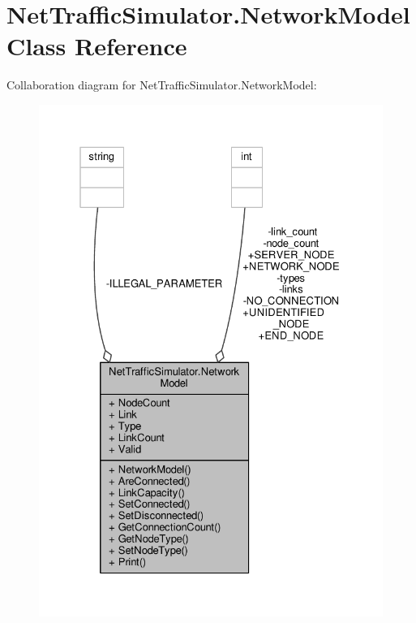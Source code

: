 \hypertarget{classNetTrafficSimulator_1_1NetworkModel}{\section{Net\-Traffic\-Simulator.\-Network\-Model Class Reference}
\label{classNetTrafficSimulator_1_1NetworkModel}
}


Collaboration diagram for Net\-Traffic\-Simulator.\-Network\-Model\-:\nopagebreak
\begin{figure}[H]
\begin{center}
\leavevmode
\includegraphics[width=327pt]{classNetTrafficSimulator_1_1NetworkModel__coll__graph}
\end{center}
\end{figure}
